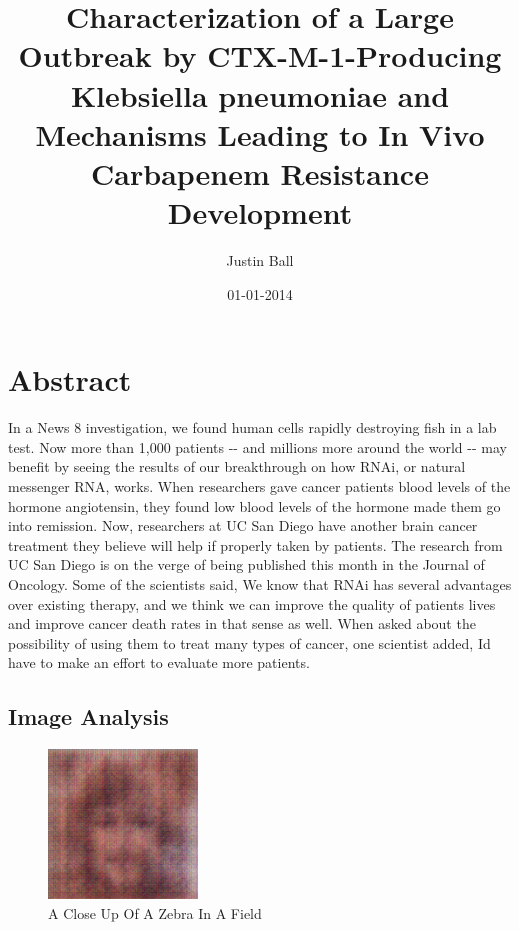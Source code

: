 \documentclass{article}%
\title{Characterization of a Large Outbreak by CTX{-}M{-}1{-}Producing Klebsiella pneumoniae and Mechanisms Leading to In Vivo Carbapenem Resistance Development}%
\author{Justin Ball}%
\affil{School of Pharmacy, Second Military Medical University, Shanghai, China}%
\date{01{-}01{-}2014}%
\begin{document}
%
\normalsize%
\maketitle%
\section{Abstract}%
\label{sec:Abstract}%
In a News 8 investigation, we found human cells rapidly destroying fish in a lab test.\newline%
Now more than 1,000 patients {-}{-} and millions more around the world {-}{-} may benefit by seeing the results of our breakthrough on how RNAi, or natural messenger RNA, works.\newline%
When researchers gave cancer patients blood levels of the hormone angiotensin, they found low blood levels of the hormone made them go into remission.\newline%
Now, researchers at UC San Diego have another brain cancer treatment they believe will help if properly taken by patients.\newline%
The research from UC San Diego is on the verge of being published this month in the Journal of Oncology.\newline%
Some of the scientists said, We know that RNAi has several advantages over existing therapy, and we think we can improve the quality of patients lives and improve cancer death rates in that sense as well.\newline%
When asked about the possibility of using them to treat many types of cancer, one scientist added, Id have to make an effort to evaluate more patients.

%
\subsection{Image Analysis}%
\label{subsec:ImageAnalysis}%


\begin{figure}[h!]%
\centering%
\includegraphics[width=150px]{500_fake_images/samples_5_331.png}%
\caption{A Close Up Of A Zebra In A Field}%
\end{figure}

%
\end{document}
